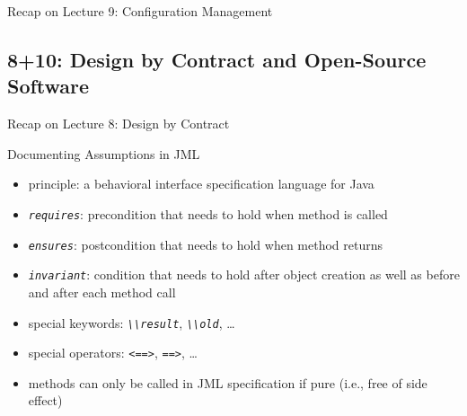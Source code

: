 \begin{frame}{Recap on Lecture 9: Configuration Management}
\begin{fancycolumns}[animation=none]
\begin{center}
		\pause
		
	\end{center}
\end{fancycolumns}
\end{frame}

\subsection{8+10: Design by Contract and Open-Source Software}
\begin{frame}{Recap on Lecture 8: Design by Contract} %
	\begin{fancycolumns}
		\begin{exampletight}{Documenting Assumptions in JML}
			\centering\makebox{\usebox{\jml}} %
		\end{exampletight}
		\nextcolumn
		\begin{definition}{\insertsubsection{} \mysource{\designofjml}}
			\begin{itemize}
				\item principle: a behavioral interface specification language for Java
				\item \emph{\lstinline|requires|}: precondition that needs to hold when method is called
				\item \emph{\lstinline|ensures|}: postcondition that needs to hold when method returns
				\item \emph{\lstinline|invariant|}: condition that needs to hold after object creation as well as before and after each method call
				\item special keywords: \emph{\lstinline|\\result|}, \emph{\lstinline|\\old|}, \ldots
				\item special operators: \emph{\lstinline|<==>|}, \emph{\lstinline|==>|}, \ldots
				\item methods can only be called in JML specification if pure (i.e., free of side effect)
			\end{itemize}
		\end{definition}
	\end{fancycolumns}
\end{frame}

